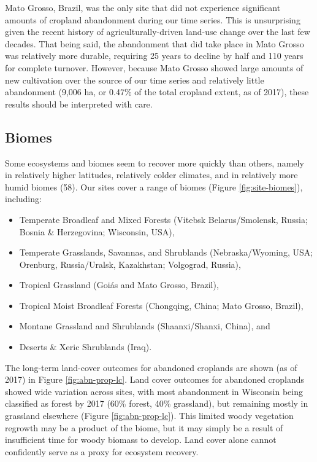 \documentclass[9pt,twocolumn,twoside,lineno]{pnas-new}
\providecommand{\tightlist}{%
  \setlength{\itemsep}{0pt}\setlength{\parskip}{0pt}}
\begin{document}
Mato Grosso, Brazil, was the only site that did not experience significant amounts of cropland abandonment during our time series.
This is unsurprising given the recent history of agriculturally-driven land-use change over the last few decades.
That being said, the abandonment that did take place in Mato Grosso was relatively more durable, requiring 25 years to decline by half and 110 years for complete turnover.
However, because Mato Grosso showed large amounts of new cultivation over the source of our time series and relatively little abandonment (9,006 ha, or 0.47\% of the total cropland extent, as of 2017), these results should be interpreted with care.

\hypertarget{biomes}{%
\subsection{Biomes}\label{biomes}}

Some ecosystems and biomes seem to recover more quickly than others, namely in relatively higher latitudes, relatively colder climates, and in relatively more humid biomes (58).
Our sites cover a range of biomes (Figure \ref{fig:site-biomes}), including:

\begin{itemize}
\tightlist
\item
  Temperate Broadleaf and Mixed Forests (Vitebsk Belarus/Smolensk, Russia; Bosnia \& Herzegovina; Wisconsin, USA),
\item
  Temperate Grasslands, Savannas, and Shrublands (Nebraska/Wyoming, USA; Orenburg, Russia/Uralsk, Kazakhstan; Volgograd, Russia),
\item
  Tropical Grassland (Goiás and Mato Grosso, Brazil),
\item
  Tropical Moist Broadleaf Forests (Chongqing, China; Mato Grosso, Brazil),
\item
  Montane Grassland and Shrublands (Shaanxi/Shanxi, China), and
\item
  Deserts \& Xeric Shrublands (Iraq).
\end{itemize}

The long-term land-cover outcomes for abandoned croplands are shown (as of 2017) in Figure \ref{fig:abn-prop-lc}.
Land cover outcomes for abandoned croplands showed wide variation across sites, with most abandonment in Wisconsin being classified as forest by 2017 (60\% forest, 40\% grassland), but remaining mostly in grassland elsewhere (Figure \ref{fig:abn-prop-lc}).
This limited woody vegetation regrowth may be a product of the biome, but it may simply be a result of insufficient time for woody biomass to develop.
Land cover alone cannot confidently serve as a proxy for ecosystem recovery.
\end{document}
